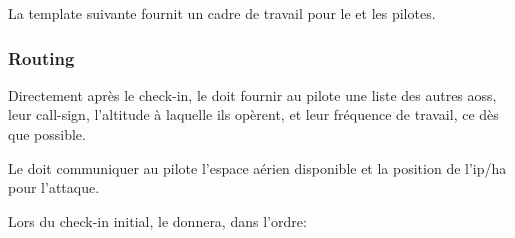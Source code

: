 La template suivante fournit un cadre de travail pour le \ja{} et les pilotes.


\subsubsection{Routing}%

Directement après le check-in, le \ja{} doit fournir au pilote une liste des autres \glspl{aos}, leur call-sign, l'altitude à laquelle ils opèrent, et leur fréquence de travail, ce dès que possible.

Le \ja{} doit communiquer au pilote l'espace aérien disponible et la position de l'\gls{ip}/\gls{ha} pour l'attaque.

Lors du check-in initial, le \ja{} donnera, dans l'ordre:

